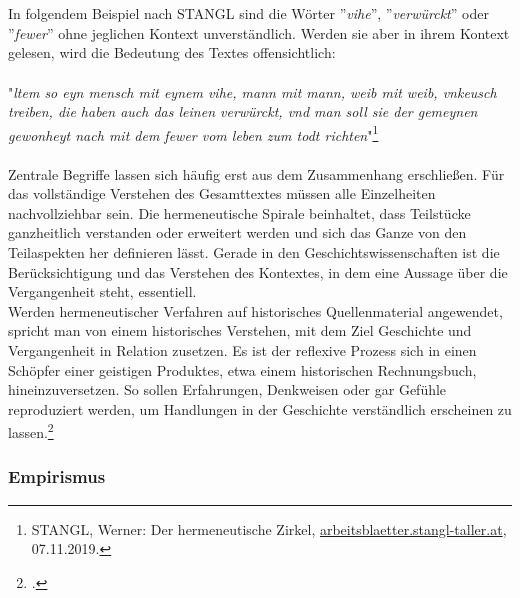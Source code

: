 \documentclass[12pt,a4paper]{article}
\begin{document}
\\
\\
In folgendem Beispiel nach STANGL sind die Wörter ''\textit{vihe}'', ''\textit{verwürckt}'' oder ''\textit{fewer}'' ohne jeglichen Kontext unverständlich. Werden sie aber in ihrem Kontext gelesen, wird die Bedeutung des Textes offensichtlich:
\\
\\
"\textit{ltem so eyn mensch mit eynem vihe, mann mit mann, weib mit weib, vnkeusch treiben, die haben auch das leinen verwürckt, vnd man soll sie der gemeynen gewonheyt nach mit dem fewer vom leben zum todt richten}"\footnote{STANGL, Werner: Der hermeneutische Zirkel, \protect\url{arbeitsblaetter.stangl-taller.at}, 07.11.2019.}
\\
\\
Zentrale Begriffe lassen sich häufig erst aus dem Zusammenhang erschließen. Für das vollständige Verstehen des Gesamttextes müssen alle Einzelheiten nachvollziehbar sein. Die hermeneutische Spirale beinhaltet, dass Teilstücke ganzheitlich verstanden oder erweitert werden und sich das Ganze von den Teilaspekten her definieren lässt. Gerade in den Geschichtswissenschaften ist die Berücksichtigung und das Verstehen des Kontextes, in dem eine Aussage über die Vergangenheit steht, essentiell.
\\
Werden hermeneutischer Verfahren auf historisches Quellenmaterial angewendet, spricht man von einem historisches Verstehen, mit dem Ziel Geschichte und Vergangenheit in Relation zusetzen. Es ist der reflexive Prozess sich in einen Schöpfer einer geistigen Produktes, etwa einem historischen Rechnungsbuch, hineinzuversetzen. So sollen Erfahrungen, Denkweisen oder gar Gefühle reproduziert werden, um Handlungen in der Geschichte verständlich erscheinen zu lassen.\footcite[][S.14-20]{detel2011geist}



\subsubsection{Empirismus}
\end{document}
